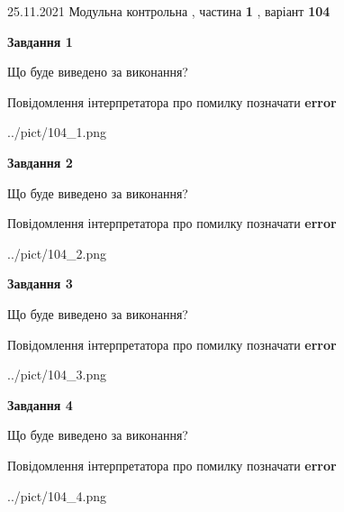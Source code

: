 \documentclass[10pt, ukrainian]{article}
\begin{document}
{25.11.2021 Модульна контрольна , частина \textbf { 1 }, варіант  \No \textbf { 104 }\par}
{
\begin {large}

{\begin {center}\textbf{Завдання 1}\end {center}}\par
Що буде виведено за виконання? \par
Повідомлення інтерпретатора про помилку позначати \textbf{error}

\begin{center}
	{../pict/104_1.png}
\end{center}
\newpage

{\begin {center}\textbf{Завдання 2}\end {center}}\par
Що буде виведено за виконання? \par
Повідомлення інтерпретатора про помилку позначати \textbf{error}

\begin{center}
	{../pict/104_2.png}
\end{center}
\newpage

{\begin {center}\textbf{Завдання 3}\end {center}}\par
Що буде виведено за виконання? \par
Повідомлення інтерпретатора про помилку позначати \textbf{error}

\begin{center}
	{../pict/104_3.png}
\end{center}
\newpage

{\begin {center}\textbf{Завдання 4}\end {center}}\par
Що буде виведено за виконання? \par
Повідомлення інтерпретатора про помилку позначати \textbf{error}

\begin{center}
	{../pict/104_4.png}
\end{center}
\newpage


\end{large}}
\end{document}
